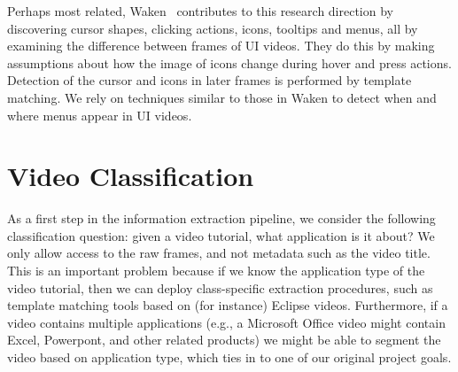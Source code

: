 \documentclass[10pt]{article}
\begin{document}
Perhaps most related, Waken~\cite{banovic_waken_2012}
contributes to this research direction by discovering cursor shapes, clicking actions, icons, tooltips and
menus, all by examining the difference between frames of UI videos.  They do this by making
assumptions about how the image of icons change during hover and press actions.  Detection of the
cursor and icons in later frames is performed by template matching.  We rely on techniques similar
to those in Waken to detect when and where menus appear in UI videos.


\section{Video Classification}\label{sec:daniel}

As a first step in the information extraction pipeline, we consider the following classification
question: given a video tutorial, what application is it about? We only allow access to the raw
frames, and not metadata such as the video title.  This is an important problem because if we know
the application type of the video tutorial, then we can deploy class-specific extraction procedures,
such as template matching tools based on (for instance) Eclipse videos. Furthermore, if a video
contains multiple applications (e.g., a Microsoft Office video might contain Excel, Powerpont, and
other related products) we might be able to segment the video based on application type, which ties
in to one of our original project goals.
\end{document}
